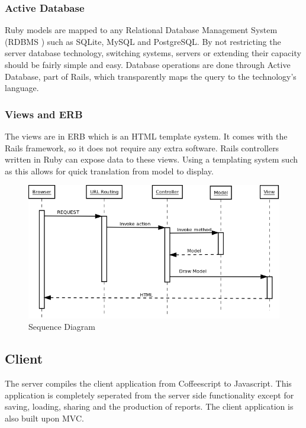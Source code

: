 \documentclass{report}
\begin{document}
				\subsubsection{Active Database}
					Ruby models are mapped to any Relational Database Management System (RDBMS \cite{rdbms}) such as SQLite, MySQL and PostgreSQL. By not restricting the server database technology, switching systems, servers or extending their capacity should be fairly simple and easy. Database operations are done through Active Database, part of Rails, which transparently maps the query to the technology's language.
					
				\subsubsection{Views and ERB} 
					The views are in ERB\cite{erb} which is an HTML template system. It comes with the Rails framework, so it does not require any extra software. Rails controllers written in Ruby can expose data to these views. Using a templating system such as this allows for quick translation from model to display. 
			\begin{figure}[htb]
				\begin{center}
				\includegraphics[width=\linewidth]{SequenceDiagramLife.png}
				\caption{Sequence Diagram}
				\label{fig: SequenceDiagram}
				\end{center}
				\end{figure}	
			\clearpage

			\subsection{Client}
				The server compiles the client application from Coffeescript to Javascript. This application is completely seperated from the server side functionality except for saving, loading, sharing and the production of reports. The client application is also built upon MVC.
				
\end{document}
